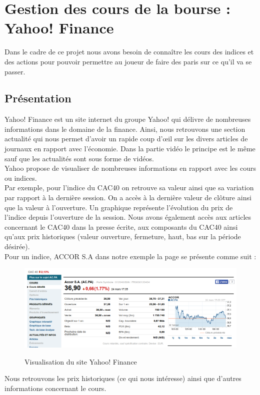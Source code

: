 \section{Gestion des cours de la bourse : Yahoo! Finance}

Dans le cadre de ce projet nous avons besoin de connaître les cours des indices et des actions pour pouvoir permettre au joueur de faire des paris sur ce qu'il va se passer.

\subsection{Présentation}

Yahoo! Finance est un site internet du groupe Yahoo! qui délivre de nombreuses informations dans le domaine de la finance. Ainsi, nous retrouvons une section actualité qui nous permet d'avoir un rapide coup d’œil sur les divers articles de journaux en rapport avec l'économie. Dans la partie vidéo le principe est le même sauf que les actualités sont sous forme de vidéos. \\

Yahoo propose de visualiser de nombreuses informations en rapport avec les cours ou indices. \\

Par exemple, pour l'indice du CAC40 on retrouve sa valeur ainsi que sa variation par rapport à la dernière session. On a accès à la dernière valeur de clôture ainsi que la valeur à l'ouverture. Un graphique représente l'évolution du prix de l'indice depuis l'ouverture de la session. Nous avons également accès aux articles concernant le CAC40 dans la presse écrite, aux composants du CAC40 ainsi qu'aux prix historiques (valeur ouverture, fermeture, haut, bas sur la période désirée). \\


Pour un indice, ACCOR S.A dans notre exemple la page se présente comme suit : \\
\begin{figure}[H]
  \center
  \includegraphics[scale=0.4]{../graph/yahoo.png} \\
  \caption{Visualisation du site Yahoo! Finance}
\end{figure}
Nous retrouvons les prix historiques (ce qui nous intéresse) ainsi que d'autres informations concernant le cours. 

